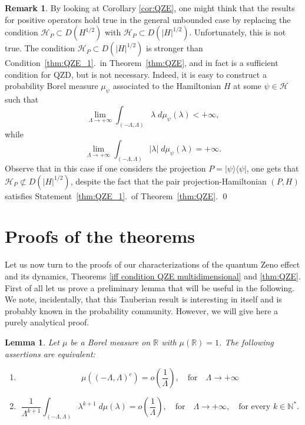 \documentclass[aip,jmp
]{revtex4}
\newcommand{\RM}{\mathbb{R}}
\newcommand{\NM}{\mathbb{N}}
\newtheorem{lemma}{Lemma}
\theoremstyle{definition}
\newtheorem{remark}{Remark}
\begin{document}
\begin{remark}
By looking at Corollary \ref{cor:QZE}, one might think that the results for positive operators hold true in the general unbounded case by replacing the condition $\mathcal{H}_{P} \subset D(H^{1/2})$ with $\mathcal{H}_{P} \subset D(|H|^{1/2})$. Unfortunately, this is not true. The condition $\mathcal{H}_{P} \subset D(|H|^{1/2})$ is stronger than Condition~\ref{thm:QZE_1}.\ in Theorem~\ref{thm:QZE}, and in fact is a sufficient condition for QZD, but is not necessary. Indeed, it is easy to construct a probability Borel measure $\mu_{\psi}$ associated to the Hamiltonian $H$ at some $\psi \in \mathcal{H}$ such that
$$
\lim_{\Lambda \to +\infty} \int_{(-\Lambda,\Lambda)} \lambda \; d\mu_{\psi}(\lambda) <+\infty,
$$
while
$$
\lim_{\Lambda \to +\infty} \int_{(-\Lambda,\Lambda)} |\lambda| \; d\mu_{\psi}(\lambda) =+\infty.
$$
Observe that in this case if one considers the projection $P=|\psi\rangle \langle \psi|$, one gets that $\mathcal{H}_{P} \not\subset D(|H|^{1/2}) $, despite the fact that the pair  projection-Hamiltonian $(P,H)$ satisfies Statement~\ref{thm:QZE_1}.\ of Theorem~\ref{thm:QZE}. \qed
\end{remark}


\section{\label{sec:iff condition}Proofs of the theorems}


Let us now turn to the proofs of our characterizations of the quantum Zeno
effect and its dynamics, Theorems \ref{iff condition QZE multidimensional} and \ref{thm:QZE}.
First of all let us prove a preliminary lemma that will be useful in the following. We note, incidentally, that this Tauberian result is interesting in itself and is probably known in the probability community. However, we will give here a purely analytical proof.
\begin{lemma}\label{tauberian lemma}
Let $\mu$ be a Borel measure on $\RM$ with $\mu(\RM)=1$. 
The following assertions are equivalent:
\begin{enumerate}
    \item
    \begin{equation*}
      \mu((-\Lambda,\Lambda)^c) = o\left( \frac{1}{\Lambda} \right), \quad \mathrm{for} \quad \Lambda \to + \infty
    \end{equation*}
    \item
      \begin{equation*}
        \frac{1}{\Lambda^{k+1}}\int_{(-\Lambda,\Lambda)} \lambda^{k+1}\; d\mu(\lambda) = o\left( \frac{1}{\Lambda} \right), \quad \mathrm{for} \quad \Lambda \to + \infty, \quad
        \textrm{for every $k \in \NM^*$}.
      \end{equation*}
    \end{enumerate}
\end{lemma}
\end{document}
